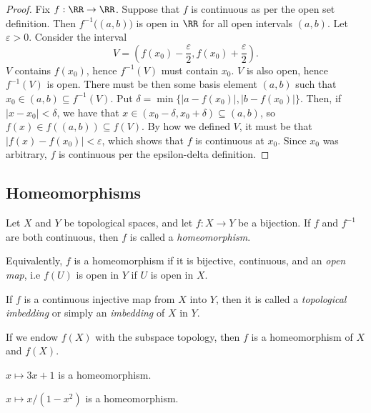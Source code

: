 \documentclass{article}
\begin{document}
\begin{proof}
    Fix $f: \RR \to \RR$.
    Suppose that $f$ is continuous as per the open set definition.
    Then $f^{-1}\big((a,b)\big)$ is open in $\RR$ for all open intervals $(a,b)$.
    Let $\varepsilon > 0$.
    Consider the interval
    \[
        V = \left(f(x_0) - \frac{\varepsilon}{2}, f(x_0) + \frac{\varepsilon}{2}\right).
    \]
    $V$ contains $f(x_0)$, hence $f^{-1}(V)$ must contain $x_0$.
    $V$ is also open, hence $f^{-1}(V)$ is open.
    There must be then some basis element $(a,b)$ such that $x_0\in (a,b) \subseteq f^{-1}(V)$.
    Put $\delta = \min\{|a-f(x_0)|, |b-f(x_0)|\}$.
    Then, if $|x - x_0| < \delta$, we have that $x \in (x_0-\delta, x_0+\delta) \subseteq (a,b)$, so $f(x) \in f((a,b)) \subseteq f(V)$.
    By how we defined $V$, it must be that $|f(x) - f(x_0)| < \varepsilon$, which shows that $f$ is continuous at $x_0$.
    Since $x_0$ was arbitrary, $f$ is continuous per the epsilon-delta definition.
\end{proof}

\subsection{Homeomorphisms}

\begin{definition}
    Let $X$ and $Y$ be topological spaces, and let $f : X \to Y$ be a bijection.
    If $f$ and $f^{-1}$ are both continuous, then $f$ is called a \textit{homeomorphism}.
\end{definition}

\begin{remark}
    Equivalently, $f$ is a homeomorphism if it is bijective, continuous, and an \textit{open map}, i.e $f(U)$ is open in $Y$ if $U$ is open in $X$.
\end{remark}

\begin{definition}
    If $f$ is a continuous injective map from $X$ into $Y$, then it is called a \textit{topological imbedding} or simply an \textit{imbedding} of $X$ in $Y$.

    If we endow $f(X)$ with the subspace topology, then $f$ is a homeomorphism of $X$ and $f(X)$.
\end{definition}

\begin{example}
    $x \mapsto 3x+1$ is a homeomorphism.
\end{example}

\begin{example}
    $x \mapsto x/(1-x^2)$ is a homeomorphism.
\end{example}
\end{document}
